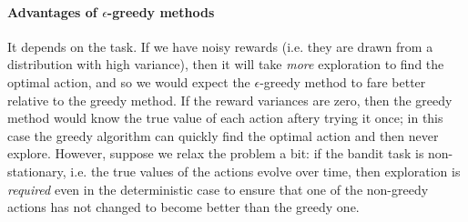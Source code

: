 \documentclass[12pt]{article}
\begin{document}
\paragraph{Advantages of $\epsilon$-greedy methods} It depends on the task. If we have noisy rewards (i.e. they are drawn from a distribution with high variance), then it will take \emph{more} exploration to find the optimal action, and so we would expect the $\epsilon$-greedy method to fare better relative to the greedy method. If the reward variances are zero, then the greedy method would know the true value of each action aftery trying it once; in this case the greedy algorithm can quickly find the optimal action and then never explore. However, suppose we relax the problem a bit: if the bandit task is non-stationary, i.e. the true values of the actions evolve over time, then exploration is \emph{required} even in the deterministic case to ensure that one of the non-greedy actions has not changed to become better than the greedy one.
\end{document}

